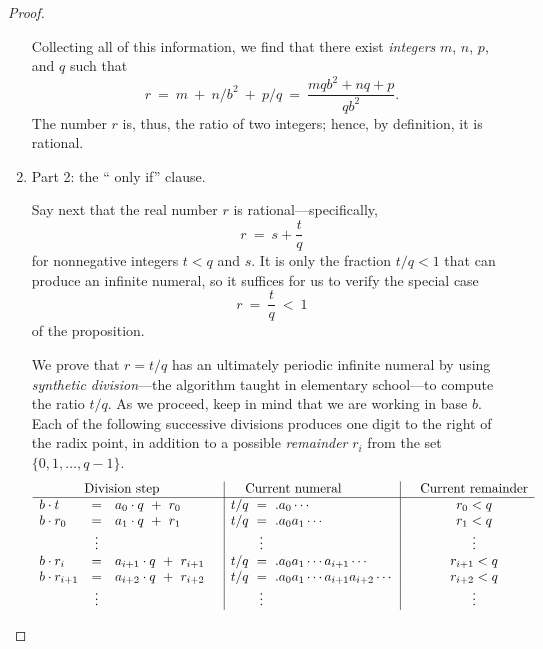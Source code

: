 \begin{proof}
\begin{enumerate}
Collecting all of this information, we find that there exist {\em
  integers} $m$, $n$, $p$, and $q$ such that
\[ r \ = \ m \ + \ n/ b^{2} \ + \ p/q \ = \
\frac{mqb^2 + nq + p}{qb^2}. \]
The number $r$ is, thus, the ratio of two integers; hence, by
definition, it is rational.

\item 
{\small\sf Part 2: the `` only if'' clause.}

Say next that the real number $r$ is rational---specifically,
\[ r \ = \ s + \frac{t}{q} \]
for nonnegative integers $t < q$ and $s$.  It is only the fraction
$t/q < 1$ that can produce an infinite numeral, so it suffices for us
to verify the special case
\[ r \ = \ \frac{t}{q} \ < \ 1 \]
of the proposition.

We prove that $r = t/q$ has an ultimately periodic infinite numeral by
using \index{synthetic division} {\it synthetic division}---the
algorithm taught in elementary school---to compute the ratio $t/q$.
As we proceed, keep in mind that we are working in base $b$.  Each of
the following successive divisions produces one digit to the right of
the radix point, in addition to a possible {\it remainder} $r_i$ from
the set $\{0, 1, \ldots, q-1\}$.
\begin{equation}
\label{eq:build-rational-numeral}
\begin{array}{lclc|l|cc}
\multicolumn{3}{c}{\mbox{Division step}} & &  \hspace*{.15in} \mbox{Current numeral} & &
\mbox{Current remainder} \\
\hline
b \cdot t   & = & a_0 \cdot q \ + \ r_0 &
      & t/q \ = \ .a_0 \cdots &
      & r_0 < q \\
b \cdot r_0 & = & a_1 \cdot q \ + \ r_1 &
      & t/q \ = \ .a_0 a_1 \cdots &
      & r_1 < q \\
            & \vdots &  & & \hspace*{.3in} \vdots &  & \vdots \\
b \cdot r_i & = & a_{i+1} \cdot q \ + \ r_{i+1} &
      & t/q \ = \ .a_0 a_1 \cdots a_{i+1} \cdots &
      & r_{i+1} < q \\
b \cdot r_{i+1} & = & a_{i+2} \cdot q \ + \ r_{i+2} &
      & t/q \ = \ .a_0 a_1 \cdots a_{i+1} a_{i+2} \cdots &
      & r_{i+2} < q \\
            & \vdots &  & &  \hspace*{.3in}\vdots & & \vdots   \\
\end{array}
\end{equation}

\end{enumerate}
\end{proof}
